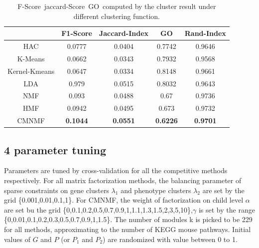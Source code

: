 \documentclass{bmcart}
\begin{document}
\begin{table}
\centering
\caption{F-Score\ jaccard-Score\ GO\ computed by the cluster result under different clustering function.}
\label{tab:go}
\begin{tabular}{|c||c|c|c|c|}
\hline
&F1-Score &Jaccard-Index& GO&Rand-Index\\
\hline
\hline
HAC&0.0777&0.0404&0.7742&0.9646\\
\hline
K-Means&0.0662  & 0.0343& 0.7932&0.9568\\
\hline
Kernel-Kmeans&0.0647&0.0334&0.8148&0.9661\\
\hline
LDA&0.979&0.0515&0.8032&0.9643\\
\hline
NMF&0.093&0.0488&0.67&0.9736\\
\hline
HMF&0.0942&0.0495&0.673&0.9732\\
\hline
CMNMF&\textbf{0.1044}& \textbf{0.0551}& \textbf{0.6226}&\textbf{0.9701}\\
\hline
\end{tabular}
\end{table}


\subsection*{4 parameter tuning}
Parameters are tuned by cross-validation for all the competitive methods respectively. For all matrix factorization methods, the balancing parameter of sparse constraints on gene clusters $\lambda_1$ and phenotype clusters $\lambda_2$ are set by the grid \{0.001,0.01,0.1,1\}. For CMNMF, the weight of factorization on child level $\alpha$ are set bu the grid \{0,0.1,0.2,0.5,0.7,0.9,1,1.1,1.3,1.5,2,3,5,10\},$\gamma$ is set by the range \{0,0.01,0.1,0.2,0.3,0.5,0.7,0.9,1,1.5\}. The number of modules k is picked to be 229 for all methods, approximating to the number of KEGG mouse pathways. Initial values of $G$ and $P$ (or $P_1$ and $P_2$) are randomized with value between 0 to 1.
\end{document}
